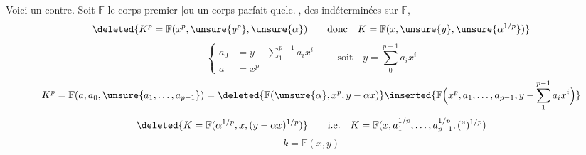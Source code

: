 Voici un contre. Soit $\mathbb F$ le corps premier
[ou un corps parfait quelc.], 
 des indéterminées sur $\mathbb F$,
 
\[
\deleted{K^p=\mathbb F(x^p,\unsure{y^p},\unsure{\alpha})
\qquad\text{donc}\quad K=\mathbb F(x,\unsure{y},\unsure{\alpha^{1/p}})}
\]
\[
\left\{\begin{aligned}
a_0&=y-\sum_1^{p-1}a_i x^i\\
a&=x^p
\end{aligned}\right.
\qquad \text{soit}\quad y=\sum_0^{p-1}a_i x^i
\]
\[
K^p=\mathbb F(a,a_0,\unsure{a_1,\ldots,a_{p-1}})
=\deleted{\mathbb F(\unsure{\alpha},x^p,y-\alpha x)}
\inserted{\mathbb F\Bigl(x^p,a_1,\ldots,a_{p-1},y-\sum_1^{p-1}a_i x^i\Bigr)}
\]
\[
\deleted{K=\mathbb F(\alpha^{1/p},x,(y-\alpha x)^{1/p})}
\qquad\text{i.e.}\quad K=\mathbb F(x,a_1^{1/p},\ldots,a_{p-1}^{1/p},(\text{''})^{1/p})
\]
\[
k=\mathbb F(x,y)
\]
\margin{[N.B. $x,\unsure{z}\in K$, donc $y=\unsure{\alpha x+\beta}\in K$,
donc $\unsure{k}\subset K$}

